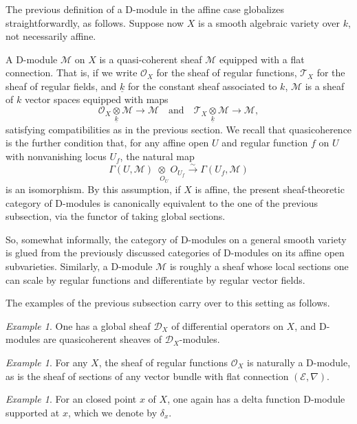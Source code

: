 \documentclass[10pt]{amsart}
\newcommand{\sM}{\mathscr{M}}
\theoremstyle{remark}
\newtheorem{ex}[subsubsection]{Example}
\newcommand{\sT}{\mathscr{T}}
\newcommand{\sE}{\mathscr{E}}
\newcommand{\OO}{\mathscr{O}}
\newcommand{\sD}{\mathscr{D}}
\numberwithin{equation}{section}
\newcommand{\ck}{\underline{k}}
\begin{document}
	
	
	\subsubsection{} The previous definition of a D-module in the affine case 
	globalizes straightforwardly, as follows. Suppose now $X$ is a smooth 
	algebraic variety over $k$, not necessarily affine. 
	
	A D-module $\sM$ on $X$ is a quasi-coherent sheaf $\sM$ equipped with a 
	flat connection. That is, if we write $\OO_X$ for the sheaf of regular 
	functions, $\sT_X$ for the sheaf of regular fields, and $\underline{k}$ for 
	the constant sheaf associated to $k$, $\sM$ is a sheaf of $k$ vector spaces 
	equipped with maps 
	\[
	\OO_X \underset{\ck}{\otimes} \sM \rightarrow \sM \quad \text{and} \quad 
	\sT_X \underset{\ck}{\otimes} \sM \rightarrow \sM,
	\]
	satisfying compatibilities as in the previous section. We recall that 
	quasicoherence is the further condition that, for any affine open $U$ and 
	regular function $f$ on $U$ with nonvanishing locus $U_f$, the natural map 
	\[
	\Gamma(U, \sM) \underset{\phantom{ii} O_U} \otimes O_{U_f} \xrightarrow{\sim} \Gamma(U_f, \sM)
	\]
	is an isomorphism. By this assumption, if $X$ is affine, the present 
	sheaf-theoretic category of D-modules is canonically equivalent to the one 
	of the previous subsection, via the functor of taking global sections. 
	
	
	So, somewhat informally, the category of D-modules on a general smooth 
	variety is glued from the previously discussed categories of D-modules on 
	its affine open subvarieties. Similarly, a D-module $\sM$ is roughly a 
	sheaf whose local sections one can scale by regular functions and 
	differentiate by regular vector fields. 
	
	The examples of the previous subsection carry over to this setting as 
	follows. 
	
	\begin{ex} One has a global sheaf $\sD_X$ of differential operators on $X$, 
	and D-modules are quasicoherent sheaves of $\sD_X$-modules.
	\end{ex}
	
	
	\begin{ex} For any $X$, the sheaf of regular functions $\OO_X$ is naturally a  D-module, as is the sheaf of sections of any 
	vector bundle with flat connection $(\sE, \nabla)$. 
	\end{ex}
	
	\begin{ex} For an closed point $x$ of $X$, one again has a delta function 
	D-module supported at $x$, which we denote by $\delta_x$. 
	\end{ex}
	
\end{document}
